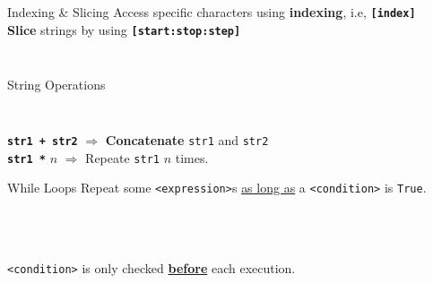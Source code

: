         \begin{frame}{Indexing \& Slicing}
            \Large
            Access specific characters using \textbf{indexing}, i.e, \texttt{\textbf{[index]}}\\
            \textbf{Slice} strings by using \texttt{\textbf{[start:stop:step]}}
            \inputminted[frame=single,framesep=2pt]{python3}{../Lecture3/code-examples/string_index.py}
            \inputminted[frame=single,framesep=2pt]{python3}{../Lecture3/code-examples/string_index2.py}
        \end{frame}

        \begin{frame}{String Operations}
            \large
            \inputminted[frame=single,framesep=2pt, lastline=4]{python3}{../Lecture3/code-examples/string_operations.py}
            \inputminted[frame=single,framesep=2pt, firstline=6]{python3}{../Lecture3/code-examples/string_operations.py}
            \LARGE
            \texttt{\textbf{str1 + str2}} $\Rightarrow$ \textbf{Concatenate} \texttt{str1} and \texttt{str2}\\
            \texttt{\textbf{str1 *}} $n$ $\Rightarrow$  Repeate \texttt{str1} $n$ times.
        \end{frame}

        \begin{frame}{While Loops}
            Repeat some \texttt{<expression>}s \underline{as long as} a \texttt{<condition>} is \texttt{True}.
            \begin{columns}
                \begin{column}{0.45\textwidth}
                    \inputminted[frame=single,framesep=2pt]{python3}{../Lecture3/code-examples/while1.py}
                \end{column}
                \begin{column}{0.45\textwidth}
                    \inputminted[frame=single,framesep=2pt]{python3}{../Lecture3/code-examples/while2.py}
                \end{column} 
            \end{columns}
            \LARGE
            \inputminted[frame=single,framesep=2pt]{python3}{../Lecture3/code-examples/while3.py}
            \texttt{<condition>} is only checked \textbf{\underline{before}} each execution.
        \end{frame}

